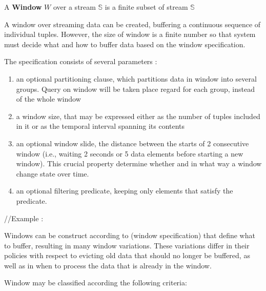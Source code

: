 \begin{defi}
A \textbf{Window} $W$ over a stream $\mathbb{S}$ is a finite subset of stream $\mathbb{S}$ \cite{Dindar:2013}
\end{defi}


A window over streaming data can be created, buffering a continuous sequence of individual tuples. However, the size of window is a finite number so that system must decide what and how to buffer data based on the window specification. 

The specification consists of several parameters :
\begin{enumerate}
\item an optional partitioning clause, which partitions data in window into several groups. Query on window will be taken place regard for each group, instead of the whole window
\item a window size, that may be expressed either as the number of tuples included in it or as the temporal interval spanning its contents
\item an optional window slide, the distance between the starts of 2 consecutive window (i.e., waiting 2 seconds or 5 data elements before starting a new window). This crucial property determine whether and in what way a window change state over time.
\item an optional filtering predicate, keeping only elements that satisfy the predicate.
\end{enumerate}

//Example : 


Windows can be construct according to (window specification) that define what to buffer, resulting in many window variations. These variations differ in their policies with respect to evicting old data that should no longer be buffered, as well as in when to process the data that is already in the window.\citep{Henrique:2014}



Window may be classified according the following criteria:

